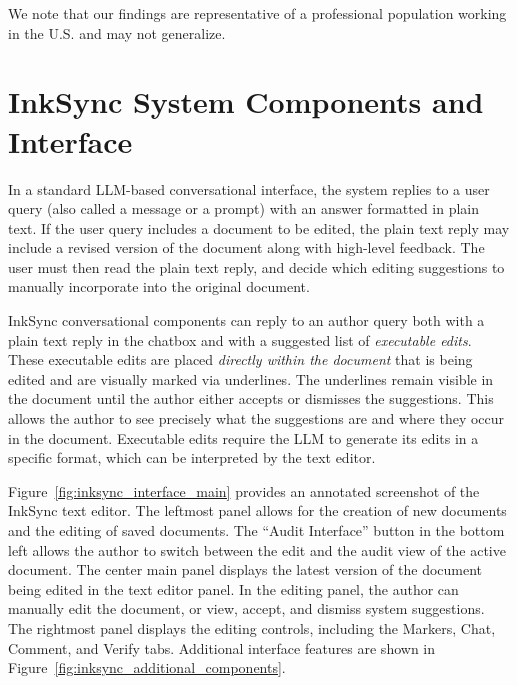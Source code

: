 \documentclass[manuscript]{acmart}
\begin{document}
We note that our findings are representative of a professional population working in the U.S. and may not generalize.

\section{InkSync System Components and Interface} \label{sec:system}

In a standard LLM-based conversational interface, the system replies to a user query (also called a message or a prompt) with an answer formatted in plain text. If the user query includes a document to be edited, the plain text reply may include a revised version of the document along with high-level feedback. The user must then read the plain text reply, and decide which editing suggestions to manually incorporate into the original document.

InkSync conversational components can reply to an author query both with a plain text reply in the chatbox and with a suggested list of \textit{executable edits}. These executable edits are placed \textit{directly within the document} that is being edited and are visually marked via underlines. The underlines remain visible in the document until the author either accepts or dismisses the suggestions. This allows the author to see precisely what the suggestions are and where they occur in the document.
Executable edits require the LLM to generate its edits in a specific format, which can be interpreted by the text editor. 

Figure~\ref{fig:inksync_interface_main} provides an annotated screenshot of the InkSync text editor. The leftmost panel allows for the creation of new documents and the editing of saved documents. The ``Audit Interface'' button in the bottom left allows the author to switch between the edit and the audit view of the active document.
The center main panel displays the latest version of the document being edited in the text editor panel. In the editing panel, the author can manually edit the document, or view, accept, and dismiss system suggestions. The rightmost panel displays the editing controls, including the Markers, Chat, Comment, and Verify tabs. Additional interface features are shown in Figure~\ref{fig:inksync_additional_components}.
\end{document}

